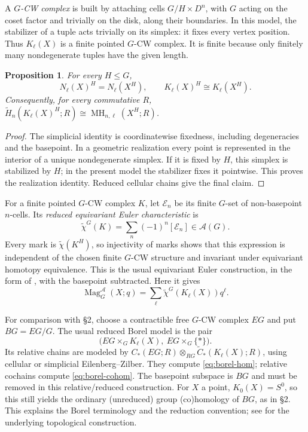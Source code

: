 \documentclass[11pt,a4paper]{article}
\newcommand{\defn}[1]{\textsl{\color{darkblue} #1}}
\numberwithin{equation}{section}
\newtheorem{proposition}[theorem]{Proposition}
\theoremstyle{definition}
\theoremstyle{remark}
\newcommand{\G}{G}
\newcommand{\MH}{\operatorname{MH}}
\newcommand{\Mag}{\operatorname{Mag}}
\newcommand{\Burn}{\mathcal A}
\begin{document}
A \defn{$\G$-CW complex} is built by attaching cells
$\G/H\times D^n$, with $\G$ acting on the coset factor and trivially
on the disk, along their boundaries.  In this model, the stabilizer
of a tuple acts trivially on its simplex: it fixes every vertex
position.  Thus $K_\ell(X)$ is a finite pointed $\G$-CW complex.
It is finite because only finitely many nondegenerate tuples have
the given length.

\begin{proposition}\label{prop:nerve-fixed}
For every $H\leq\G$,
\[
 N_\ell(X)^H=N_\ell(X^H),\qquad
 K_\ell(X)^H\cong K_\ell(X^H).
\]
Consequently, for every commutative $R$,
$\widetilde H_n(K_\ell(X)^H;R)\cong\MH_{n,\ell}(X^H;R)$.
\end{proposition}
\begin{proof}
The simplicial identity is coordinatewise fixedness, including
degeneracies and the basepoint.  In a geometric realization every
point is represented in the interior of a unique nondegenerate
simplex.  If it is fixed by $H$, this simplex is stabilized by $H$;
in the present model the stabilizer fixes it pointwise.  This proves
the realization identity.  Reduced cellular chains give the final
claim.
\end{proof}

For a finite pointed $\G$-CW complex $K$, let $\mathscr E_n$ be its
finite $\G$-set of non-basepoint $n$-cells.  Its \defn{reduced
equivariant Euler characteristic} is
\[
 \widetilde\chi^\G(K)=\sum_n(-1)^n[\mathscr E_n]\in\Burn(\G).
\]
Every mark is $\widetilde\chi(K^H)$, so injectivity of marks shows
that this expression is independent of the chosen finite
$\G$-CW structure and invariant under equivariant homotopy equivalence.
This is the usual equivariant Euler construction, in the form of
\cite[\S4]{Bouc}, with the basepoint subtracted.  Here it gives
\begin{equation}\label{eq:burnside-topological}
 \Mag^{\Burn}_\G(X;q)
   =\sum_\ell\widetilde\chi^\G(K_\ell(X))q^\ell.
\end{equation}

For comparison with \S2, choose a contractible free $\G$-CW complex
$E\G$ and put $B\G=E\G/\G$.  The usual reduced Borel model is the
pair
\[
 \bigl(E\G\times_\G K_\ell(X),\ E\G\times_\G\{*\}\bigr).
\]
Its relative chains are modeled by
$C_*(E\G;R)\otimes_{R\G}\widetilde C_*(K_\ell(X);R)$, using
cellular or simplicial Eilenberg--Zilber.  They compute
\eqref{eq:borel-hom}; relative cochains compute
\eqref{eq:borel-cohom}.  The basepoint subspace is $B\G$ and must be
removed in this relative/reduced construction.  For $X$ a point,
$K_0(X)=S^0$, so this still yields the ordinary (unreduced) group
(co)homology of $B\G$, as in \S2.  This explains the Borel terminology
and the reduction convention; see \cite[\S2.1.4]{Guillou} for the
underlying topological construction.
\end{document}
